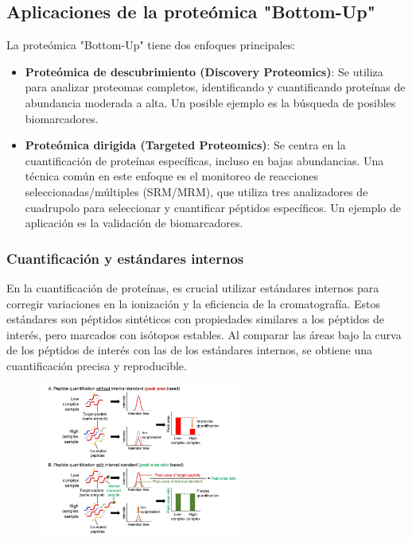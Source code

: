 \subsection{Aplicaciones de la proteómica "Bottom-Up"}
La proteómica "Bottom-Up" tiene dos enfoques principales:
\begin{itemize}
\item \textbf{Proteómica de descubrimiento (Discovery Proteomics)}: Se utiliza para analizar proteomas completos, identificando y cuantificando proteínas de abundancia moderada a alta. Un posible ejemplo es la búsqueda de posibles biomarcadores.
\item \textbf{Proteómica dirigida (Targeted Proteomics)}: Se centra en la cuantificación de proteínas específicas, incluso en bajas abundancias. Una técnica común en este enfoque es el monitoreo de reacciones seleccionadas/múltiples (SRM/MRM), que utiliza tres analizadores de cuadrupolo para seleccionar y cuantificar péptidos específicos. Un ejemplo de aplicación es la validación de biomarcadores.
\end{itemize}

\subsubsection{Cuantificación y estándares internos}
En la cuantificación de proteínas, es crucial utilizar estándares internos para corregir variaciones en la ionización y la eficiencia de la cromatografía. Estos estándares son péptidos sintéticos con propiedades similares a los péptidos de interés, pero marcados con isótopos estables. Al comparar las áreas bajo la curva de los péptidos de interés con las de los estándares internos, se obtiene una cuantificación precisa y reproducible.

\begin{figure}[h]
\centering
\includegraphics[width = 0.6\textwidth]{figs/internal-standard.png}
\end{figure}

